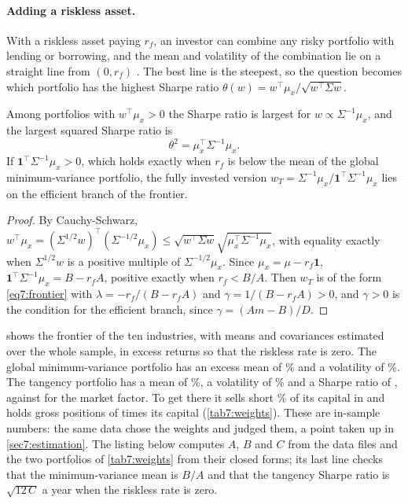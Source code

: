 \begin{chapterrefs}
\paragraph{Adding a riskless asset.}
With a riskless asset paying $r_f$, an investor can combine any risky portfolio with lending or
borrowing, and the mean and volatility of the combination lie on a straight line from $(0,r_f)$
\parencite{tobin1958}. The best line is the steepest, so the question becomes which portfolio has
the highest Sharpe ratio $\theta(w)=w^\top\mu_x/\sqrt{w^\top\Sigma w}$.

\begin{proposition}\label{prop7:tangency}
Among portfolios with $w^\top\mu_x>0$ the Sharpe ratio is largest for $w\propto\Sigma^{-1}\mu_x$, and
the largest squared Sharpe ratio is
\begin{equation}\label{eq7:theta}
  \theta^2=\mu_x^\top\Sigma^{-1}\mu_x .
\end{equation}
If $\mathbf 1^\top\Sigma^{-1}\mu_x>0$, which holds exactly when $r_f$ is below the mean of the global
minimum-variance portfolio, the fully invested version $w_T=\Sigma^{-1}\mu_x/\mathbf 1^\top\Sigma^{-1}\mu_x$
lies on the efficient branch of the frontier.
\end{proposition}

\begin{proof}
By Cauchy-Schwarz, $w^\top\mu_x=(\Sigma^{1/2}w)^\top(\Sigma^{-1/2}\mu_x)\le\sqrt{w^\top\Sigma w}\sqrt{\mu_x^\top\Sigma^{-1}\mu_x}$,
with equality exactly when $\Sigma^{1/2}w$ is a positive multiple of $\Sigma^{-1/2}\mu_x$. Since
$\mu_x=\mu-r_f\mathbf 1$, $\mathbf 1^\top\Sigma^{-1}\mu_x=B-r_fA$, positive exactly when $r_f<B/A$.
Then $w_T$ is of the form \cref{eq7:frontier} with $\lambda=-r_f/(B-r_fA)$ and $\gamma=1/(B-r_fA)>0$,
and $\gamma>0$ is the condition for the efficient branch, since $\gamma=(Am-B)/D$.
\end{proof}

 shows the frontier of the ten industries, with means and covariances estimated
over the whole sample, in excess returns so that the riskless rate is zero. The global
minimum-variance portfolio has an excess mean of \frGmvMu\% and a volatility of \frGmvVol\%. The
tangency portfolio has a mean of \frTanMu\%, a volatility of \frTanVol\% and a Sharpe ratio of
\frTanSR, against \frMktSR{} for the market factor. To get there it sells short \frShortMax\% of its
capital in \frShortName{} and holds gross positions of \frGross{} times its capital
(\cref{tab7:weights}). These are in-sample numbers: the same data chose the weights and judged them,
a point taken up in \cref{sec7:estimation}.
The listing below computes $A$, $B$ and $C$ from the data files and the two portfolios of
\cref{tab7:weights} from their closed forms; its last line checks that the minimum-variance mean is
$B/A$ and that the tangency Sharpe ratio is $\sqrt{12\,C}$ a year when the riskless rate is zero.



\end{chapterrefs}
